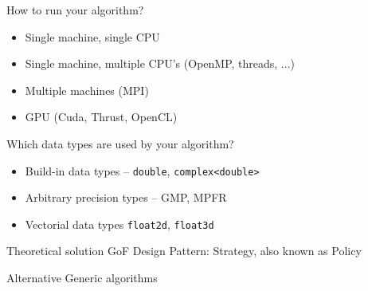 \begin{frame}
  

  \vspace{1ex}

  How to run your algorithm?
    \begin{itemize}
      \item Single machine, single CPU
      \item Single machine, multiple CPU's (OpenMP, threads, ...)
      \item Multiple machines (MPI)
      \item GPU (Cuda, Thrust, OpenCL)
    \end{itemize}

  \pause

  \vspace{1ex}

  Which data types are used by your algorithm?
   \begin{itemize}
    \item Build-in data types -- \texttt{double}, \texttt{complex<double>}
    \item Arbitrary precision types -- GMP, MPFR
    \item Vectorial data types \texttt{float2d}, \texttt{float3d}
   \end{itemize}

  \pause

  \vspace{1ex}

  \begin{block}{Theoretical solution}
    GoF Design Pattern: Strategy, also known as Policy
  \end{block}

  \begin{exampleblock}{Alternative}
   Generic algorithms
  \end{exampleblock}

\end{frame}



